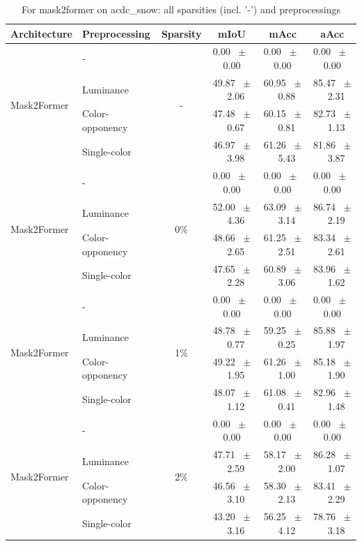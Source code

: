 \begin{table}[h]
  \centering
  \caption{For mask2former on acdc_snow: all sparsities (incl. '-') and preprocessings}
  \begin{tabular}{@{}l l c c c c@{}}
    \toprule
    Architecture & Preprocessing & Sparsity & mIoU & mAcc & aAcc \\
    \midrule
    \multirow{4}{*}{Mask2Former} & - & \multirow{4}{*}{-} & 0.00 ~$\pm$~ 0.00 & 0.00 ~$\pm$~ 0.00 & 0.00 ~$\pm$~ 0.00 \\
    & Luminance &  & 49.87 ~$\pm$~ 2.06 & 60.95 ~$\pm$~ 0.88 & 85.47 ~$\pm$~ 2.31 \\
    & Color-opponency &  & 47.48 ~$\pm$~ 0.67 & 60.15 ~$\pm$~ 0.81 & 82.73 ~$\pm$~ 1.13 \\
    & Single-color &  & 46.97 ~$\pm$~ 3.98 & 61.26 ~$\pm$~ 5.43 & 81.86 ~$\pm$~ 3.87 \\
    \midrule
    \multirow{4}{*}{Mask2Former} & - & \multirow{4}{*}{0\%} & 0.00 ~$\pm$~ 0.00 & 0.00 ~$\pm$~ 0.00 & 0.00 ~$\pm$~ 0.00 \\
    & Luminance &  & 52.00 ~$\pm$~ 4.36 & 63.09 ~$\pm$~ 3.14 & 86.74 ~$\pm$~ 2.19 \\
    & Color-opponency &  & 48.66 ~$\pm$~ 2.65 & 61.25 ~$\pm$~ 2.51 & 83.34 ~$\pm$~ 2.61 \\
    & Single-color &  & 47.65 ~$\pm$~ 2.28 & 60.89 ~$\pm$~ 3.06 & 83.96 ~$\pm$~ 1.62 \\
    \midrule
    \multirow{4}{*}{Mask2Former} & - & \multirow{4}{*}{1\%} & 0.00 ~$\pm$~ 0.00 & 0.00 ~$\pm$~ 0.00 & 0.00 ~$\pm$~ 0.00 \\
    & Luminance &  & 48.78 ~$\pm$~ 0.77 & 59.25 ~$\pm$~ 0.25 & 85.88 ~$\pm$~ 1.97 \\
    & Color-opponency &  & 49.22 ~$\pm$~ 1.95 & 61.26 ~$\pm$~ 1.00 & 85.18 ~$\pm$~ 1.90 \\
    & Single-color &  & 48.07 ~$\pm$~ 1.12 & 61.08 ~$\pm$~ 0.41 & 82.96 ~$\pm$~ 1.48 \\
    \midrule
    \multirow{4}{*}{Mask2Former} & - & \multirow{4}{*}{2\%} & 0.00 ~$\pm$~ 0.00 & 0.00 ~$\pm$~ 0.00 & 0.00 ~$\pm$~ 0.00 \\
    & Luminance &  & 47.71 ~$\pm$~ 2.59 & 58.17 ~$\pm$~ 2.00 & 86.28 ~$\pm$~ 1.07 \\
    & Color-opponency &  & 46.56 ~$\pm$~ 3.10 & 58.30 ~$\pm$~ 2.13 & 83.41 ~$\pm$~ 2.29 \\
    & Single-color &  & 43.20 ~$\pm$~ 3.16 & 56.25 ~$\pm$~ 4.12 & 78.76 ~$\pm$~ 3.18 \\
    \midrule

\end{tabular}
\end{table}
